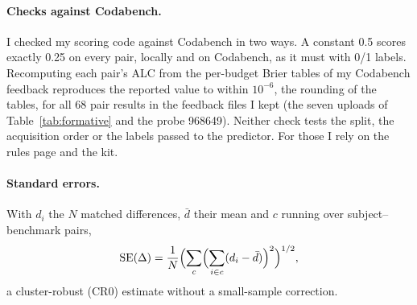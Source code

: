 \paragraph{Checks against Codabench.}
I checked my scoring code against Codabench in two ways. A constant 0.5 scores exactly 0.25 on every pair, locally and on Codabench, as it must with 0/1 labels. Recomputing each pair's ALC from the per-budget Brier tables of my Codabench feedback reproduces the reported value to within $10^{-6}$, the rounding of the tables, for all 68 pair results in the feedback files I kept (the seven uploads of Table~\ref{tab:formative} and the probe 968649). Neither check tests the split, the acquisition order or the labels passed to the predictor. For those I rely on the rules page and the kit.

\paragraph{Standard errors.}
With $d_i$ the $N$ matched differences, $\bar d$ their mean and $c$ running over subject--benchmark pairs,
\begin{equation}
  \mathrm{SE}(\Delta) = \frac{1}{N} \Bigl( \sum_c \Bigl( \sum_{i \in c} (d_i - \bar d) \Bigr)^2 \Bigr)^{1/2},
  \label{eq:se}
\end{equation}
a cluster-robust (CR0) estimate without a small-sample correction.
